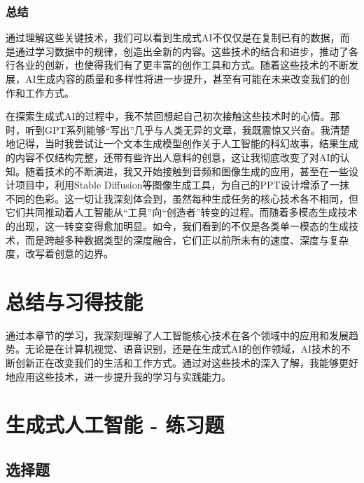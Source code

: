 \subsubsection*{总结}
通过理解这些关键技术，我们可以看到生成式AI不仅仅是在复制已有的数据，而是通过学习数据中的规律，创造出全新的内容。这些技术的结合和进步，推动了各行各业的创新，也使得我们有了更丰富的创作工具和方式。随着这些技术的不断发展，AI生成内容的质量和多样性将进一步提升，甚至有可能在未来改变我们的创作和工作方式。

在探索生成式AI的过程中，我不禁回想起自己初次接触这些技术时的心情。那时，听到GPT系列能够“写出”几乎与人类无异的文章，我既震惊又兴奋。我清楚地记得，当时我尝试让一个文本生成模型创作关于人工智能的科幻故事，结果生成的内容不仅结构完整，还带有些许出人意料的创意，这让我彻底改变了对AI的认知。随着技术的不断演进，我又开始接触到音频和图像生成的应用，甚至在一些设计项目中，利用Stable Diffusion等图像生成工具，为自己的PPT设计增添了一抹不同的色彩。这一切让我深刻体会到，虽然每种生成任务的核心技术各不相同，但它们共同推动着人工智能从“工具”向“创造者”转变的过程。而随着多模态生成技术的出现，这一转变变得愈加明显。如今，我们看到的不仅是各类单一模态的生成技术，而是跨越多种数据类型的深度融合，它们正以前所未有的速度、深度与复杂度，改写着创意的边界。



\section{总结与习得技能}

通过本章节的学习，我深刻理解了人工智能核心技术在各个领域中的应用和发展趋势。无论是在计算机视觉、语音识别，还是在生成式AI的创作领域，AI技术的不断创新正在改变我们的生活和工作方式。通过对这些技术的深入了解，我能够更好地应用这些技术，进一步提升我的学习与实践能力。

\section*{生成式人工智能 - 练习题}

\subsection*{选择题}

